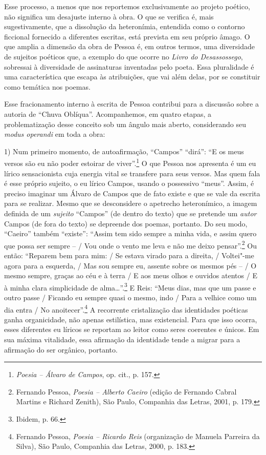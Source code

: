Esse processo, a menos que nos reportemos exclusivamente ao projeto
poético, não significa um desajuste interno à obra. O que se verifica é,
mais sugestivamente, que a dissolução da heteronímia, entendida como o
contorno ficcional fornecido a diferentes escritas, está prevista em seu
próprio âmago. O que amplia a dimensão da obra de Pessoa é, em outros
termos, uma diversidade de sujeitos poéticos que, a exemplo do que
ocorre no \emph{Livro do Desassossego}, sobressai à diversidade de
assinaturas inventadas pelo poeta. Essa pluralidade é uma característica
que escapa às atribuições, que vai além delas, por se constituir como
temática nos poemas.

Esse fracionamento interno à escrita de Pessoa contribui para a
discussão sobre a autoria de ``Chuva Oblíqua''. Acompanhemos, em quatro
etapas, a problematização desse conceito sob um ângulo mais aberto,
considerando seu \emph{modus operandi} em toda a obra:

1) Num primeiro momento, de autoafirmação, ``Campos'' ``dirá'': ``E os
meus versos são eu não poder estoirar de viver''.\footnote{\emph{Poesia
  -- Álvaro de Campos}, op. cit., p. 157.} O que Pessoa nos apresenta é
um eu lírico sensacionista cuja energia vital se transfere para seus
versos. Mas quem fala é esse próprio sujeito, o eu lírico Campos, usando
o possessivo ``meus''. Assim, é preciso imaginar um Álvaro de Campos que
de fato existe e que se vale da escrita para se realizar. Mesmo que se
desconsidere o apetrecho heteronímico, a imagem definida de um
\emph{sujeito} ``Campos'' (de dentro do texto) que se pretende um
\emph{autor} Campos (de fora do texto) se depreende dos poemas,
portanto. Do seu modo, ``Caeiro'' também ``existe'': ``Assim tem sido
sempre a minha vida, e assim quero que possa ser sempre -- / Vou onde o
vento me leva e não me deixo pensar''.\footnote{Fernando Pessoa,
  \emph{Poesia -- Alberto Caeiro} (edição de Fernando Cabral Martins e
  Richard Zenith), São Paulo, Companhia das Letras, 2001, p. 179.} Ou
então: ``Reparem bem para mim: / Se estava virado para a direita, /
Voltei"-me agora para a esquerda, / Mas sou sempre eu, assente sobre os
mesmos pés -- / O mesmo sempre, graças ao céu e à terra / E aos meus
olhos e ouvidos atentos / E à minha clara simplicidade de
alma\ldots{}''.\footnote{Ibidem, p. 66.} E Reis: ``Meus dias, mas que um
passe e outro passe / Ficando eu sempre quasi o mesmo, indo / Para a
velhice como um dia entra / No anoitecer''.\footnote{Fernando Pessoa,
  \emph{Poesia -- Ricardo Reis} (organização de Manuela Parreira da
  Silva), São Paulo, Companhia das Letras, 2000, p. 183.} A recorrente
cristalização das identidades poéticas ganha organicidade, não apenas
estilística, mas existencial. Para que isso ocorra, esses diferentes eu
líricos se reportam ao leitor como seres coerentes e únicos. Em sua
máxima vitalidade, essa afirmação da identidade tende a migrar para a
afirmação do ser orgânico, portanto.

